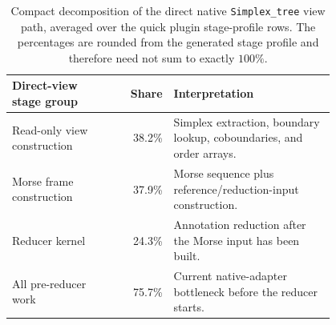 \begin{table}[ht]
\centering
\small
\setlength{\tabcolsep}{3pt}
\begin{tabular}{p{0.30\linewidth}rp{0.50\linewidth}}
\toprule
Direct-view stage group & Share & Interpretation \\
\midrule
Read-only view construction & 38.2\% & Simplex extraction, boundary lookup, coboundaries, and order arrays. \\
Morse frame construction & 37.9\% & Morse sequence plus reference/reduction-input construction. \\
Reducer kernel & 24.3\% & Annotation reduction after the Morse input has been built. \\
\midrule
All pre-reducer work & 75.7\% & Current native-adapter bottleneck before the reducer starts. \\
\bottomrule
\end{tabular}
\caption{Compact decomposition of the direct native \texttt{Simplex\_tree} view path,
averaged over the quick plugin stage-profile rows.  The percentages are rounded from the
generated stage profile and therefore need not sum to exactly $100\%$.}
\label{tab:native-gudhi-overhead-summary}
\end{table}
